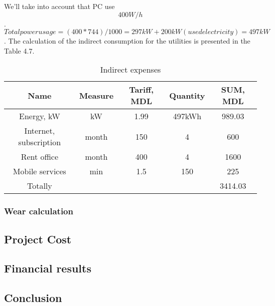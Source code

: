 We’ll take into account that PC use \[400W/h\]. \[ Total power usage = (400 * 744)/1000= 297 kW + 200 kW (used electricity) = 497kW\]. The calculation of the indirect consumption for the utilities is presented in the Table 4.7. 

\begin{table}[]
\centering
\caption{Indirect expenses }
\label{indirect-expenses}
\begin{tabular}{|c|c|c|c|c|}
\hline
Name                   & Measure & Tariff, MDL & Quantity & SUM, MDL \\ \hline
Energy, kW             & kW      & 1.99        & 497kWh   & 989.03   \\ \hline
Internet, subscription & month   & 150         & 4        & 600      \\ \hline
Rent office            & month   & 400         & 4        & 1600     \\ \hline
Mobile services        & min     & 1.5         & 150      & 225      \\ \hline
Totally                &         &             &          & 3414.03  \\ \hline
\end{tabular}
\end{table}

\subsubsection{Wear calculation}



\subsection{Project Cost}



\subsection{Financial results}



\subsection{Conclusion}